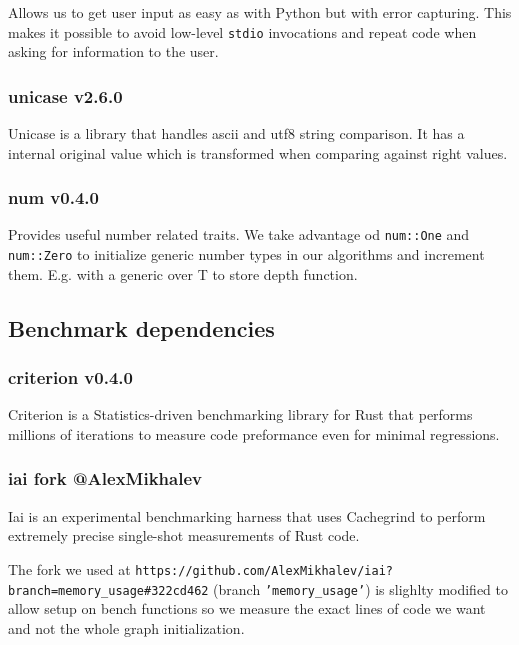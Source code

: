 Allows us to get user input as easy as with Python but with error capturing. This makes it possible to avoid
low-level \texttt{stdio} invocations and repeat code when asking for information to the user.

\subsubsection{unicase v2.6.0}

Unicase is a library that handles ascii and utf8 string comparison. It has a internal original value which is
transformed when comparing against right values.

\subsubsection{num v0.4.0}

Provides useful number related traits. We take advantage od \texttt{num::One} and \texttt{num::Zero} to initialize
generic number types in our algorithms and increment them. E.g. with a generic over T to store depth function.

\subsection{Benchmark dependencies}

\subsubsection{criterion v0.4.0}

Criterion is a Statistics-driven benchmarking library for Rust that performs millions of iterations to measure code preformance
even for minimal regressions. \autocite{criterion}

\subsubsection{iai fork @AlexMikhalev}

Iai is an experimental benchmarking harness that uses Cachegrind to perform extremely precise
single-shot measurements of Rust code.

The fork we used at \texttt{https://github.com/AlexMikhalev/iai?branch=memory\_usage\#322cd462} (branch \texttt{'memory\_usage'}) is slighlty
modified to allow setup on bench functions so we measure the exact lines of code we want and not the whole
graph initialization. \autocite{iai}

